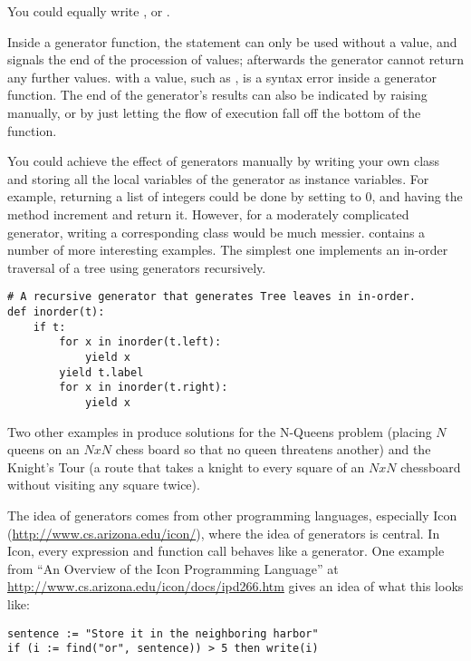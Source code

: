 \documentclass{howto}
\begin{document}
You could equally write , or
.

Inside a generator function, the  statement can only
be used without a value, and signals the end of the procession of
values; afterwards the generator cannot return any further values.
 with a value, such as , is a syntax
error inside a generator function.  The end of the generator's results
can also be indicated by raising  manually,
or by just letting the flow of execution fall off the bottom of the
function.

You could achieve the effect of generators manually by writing your
own class and storing all the local variables of the generator as
instance variables.  For example, returning a list of integers could
be done by setting  to 0, and having the
 method increment  and return it.
However, for a moderately complicated generator, writing a
corresponding class would be much messier.
 contains a number of more
interesting examples.  The simplest one implements an in-order
traversal of a tree using generators recursively.

\begin{verbatim}
# A recursive generator that generates Tree leaves in in-order.
def inorder(t):
    if t:
        for x in inorder(t.left):
            yield x
        yield t.label
        for x in inorder(t.right):
            yield x
\end{verbatim}

Two other examples in  produce
solutions for the N-Queens problem (placing $N$ queens on an $NxN$
chess board so that no queen threatens another) and the Knight's Tour
(a route that takes a knight to every square of an $NxN$ chessboard
without visiting any square twice). 

The idea of generators comes from other programming languages,
especially Icon (\url{http://www.cs.arizona.edu/icon/}), where the
idea of generators is central.  In Icon, every
expression and function call behaves like a generator.  One example
from ``An Overview of the Icon Programming Language'' at
\url{http://www.cs.arizona.edu/icon/docs/ipd266.htm} gives an idea of
what this looks like:

\begin{verbatim}
sentence := "Store it in the neighboring harbor"
if (i := find("or", sentence)) > 5 then write(i)
\end{verbatim}
\end{document}
